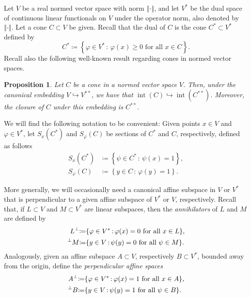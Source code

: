 \documentclass[10pt]{amsart}
\newtheorem{proposition}[thm]{Proposition}
\theoremstyle{definition}
\theoremstyle{remark}
\begin{document}
Let $V$ be a real normed vector space with norm ${\left\Vert {\cdot} \right\Vert}$,
and let $V^{*}$ be the dual space of continuous linear functionals
on $V$ under the operator norm, also denoted by ${\left\Vert {\cdot} \right\Vert}$.
Let a cone $C \subset V$ be given.  Recall that the dual of $C$ is
the cone ${{C}^{\ast}} \subset {V^{\ast}}$ defined by
\begin{equation*}
   {{C}^{\ast}} {\mathrel{\coloneqq}} {\left\lbrace {{\varphi} \in {V^{\ast}} {\,:\,} \text{${\varphi}(x)
   \ge 0$ for all $x \in C$}} \right\rbrace}.
\end{equation*}
Recall also the following well-known result regarding cones in
normed vector spaces.
\begin{proposition}
  Let $C$ be a cone in a normed vector space $V$.  Then, under
  the canonical embedding $V \hookrightarrow {V^{\ast\ast}}$, we have
  that ${\operatorname{int}}(C) \hookrightarrow {\operatorname{int}}({C^{\ast\ast}})$.  Moreover,
  the closure of $C$ under this embedding is ${{C}^{\ast\ast}}$.
\end{proposition}

We will find the following notation to be convenient: Given points
$x \in V$ and ${\varphi} \in {V^{\ast}}$, let $ S_x({C^{\ast}}) $ and $
S_{\varphi}(C) $ be sections of $ C^{*} $ and $ C $, respectively,
defined as follows
\begin{align*}
   S_{x}({C^{\ast}}) & {\mathrel{\coloneqq}} {\left\lbrace {\psi \in {C^{\ast}} {\,:\,} \psi(x)
   = 1} \right\rbrace},  \\
   S_{\varphi}(C) & {\mathrel{\coloneqq}} {\left\lbrace {y \in C {\,:\,} {\varphi}(y) = 1} \right\rbrace}.
\end{align*}

More generally, we will occasionally need a canonical affine
subspace in $V$ or ${V^{\ast}}$ that is perpendicular to a given
affine subspace of ${V^{\ast}}$ or $V$, respectively.  Recall that,
if $L \subset V$ and $M \subset {{V}^{\ast}}$ are linear subspaces,
then the \emph{annihilators} of $L$ and $M$ are defined by
\begin{align*}
   L^{\perp} & {\mathrel{\coloneqq}} {\left\lbrace {{\varphi} \in {{V}^{\ast}} {\,:\,}
   \text{${\varphi}(x) = 0$ for all $x \in L$}} \right\rbrace},\\
   {\prescript{\perp}{}{{M}}} & {\mathrel{\coloneqq}} {\left\lbrace {y \in V {\,:\,} \text{$\psi(y) = 0$
   for all $\psi \in M$}} \right\rbrace}.
\end{align*}
Analogously, given an affine subspace $A \subset V$, respectively
$B \subset {{V}^{\ast}}$, bounded away from the origin, define the
\emph{perpendicular affine spaces}
\begin{align*}
   A^{\perp} & {\mathrel{\coloneqq}} {\left\lbrace {{\varphi} \in {{V}^{\ast}} {\,:\,}
   \text{${\varphi}(x) = 1$ for all $x \in A$}} \right\rbrace},\\
   {\prescript{\perp}{}{{B}}} & {\mathrel{\coloneqq}} {\left\lbrace {y \in V {\,:\,} \text{$\psi(y) = 1$
   for all $\psi \in B$}} \right\rbrace}.
\end{align*}
\end{document}
